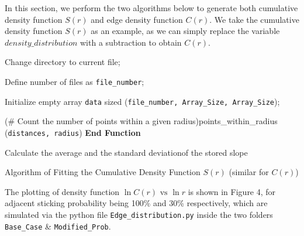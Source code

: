 \documentclass[10pt]{article}
\begin{document}
In this section, we perform the two algorithms below to generate both cumulative density function $S(r)$ and edge density function $C(r)$. We take the cumulative density function $S(r)$ as an example, as we can simply replace the variable $density\_distribution$ with a subtraction to obtain $C(r)$.

\begin{algorithm}[H]
	\SetAlgoLined
	
	\hfill
	
	Change directory to current file;
	
	Define number of files as \texttt{file\_number};
	
	Initialize empty array \texttt{data} sized (\texttt{file\_number, Array\_Size, Array\_Size});
	
	\hfill
	

	\hfill
	
	\Fn(\# Count the number of points within a given radius){points\_within\_radius (\texttt{distances, radius})}{
	}
	\textbf{End Function}

	\hfill
	
	
	Calculate the average and the standard deviationof the stored slope
	
	\caption{Algorithm of Fitting the Cumulative Density Function $S(r)$ (similar for $C(r)$)}
\end{algorithm}

The plotting of density function $\ln C(r) \text{ vs } \ln r$ is shown in Figure 4, for adjacent sticking probability being 100\% and 30\% respectively, which are simulated via the python file \texttt{Edge\_distribution.py} inside the two folders \texttt{Base\_Case} \& \texttt{Modified\_Prob}.
\end{document}
